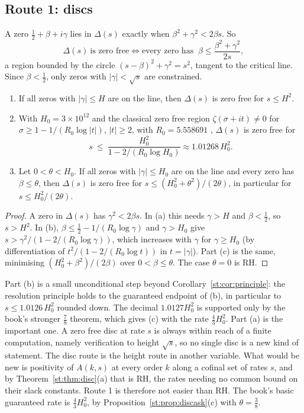 \subsection{Route 1: discs}
A zero $\tfrac12+\beta+i\gamma$ lies in $\Delta(s)$ exactly when $\beta^2+\gamma^2<2\beta s$. So
\[
\Delta(s)\ \text{is zero free}\iff\text{every zero has }\ \beta\le\frac{\beta^2+\gamma^2}{2s},
\]
a region bounded by the circle $(s-\beta)^2+\gamma^2=s^2$, tangent to the critical line. Since $\beta<\tfrac12$, only zeros with $|\gamma|<\sqrt s$ are constrained.
\begin{proposition}\label{st:prop:discask}
\begin{enumerate}
\item[(a)] If all zeros with $|\gamma|\le H$ are on the line, then $\Delta(s)$ is zero free for $s\le H^2$.
\item[(b)] With $H_0=3\times10^{12}$ and the classical zero free region $\zeta(\sigma+it)\ne0$ for $\sigma\ge1-1/(R_0\log|t|)$, $|t|\ge2$, with $R_0=5.558691$ \cite{MTY}, $\Delta(s)$ is zero free for
\[
s\ \le\ \frac{H_0^2}{1-2/(R_0\log H_0)}\approx1.01268\,H_0^2 .
\]
\item[(c)] Let $0<\theta<H_0$. If all zeros with $|\gamma|\le H_0$ are on the line and every zero has $\beta\le\theta$, then $\Delta(s)$ is zero free for $s\le(H_0^2+\theta^2)/(2\theta)$, in particular for $s\le H_0^2/(2\theta)$.
\end{enumerate}
\end{proposition}
\begin{proof}
A zero in $\Delta(s)$ has $\gamma^2<2\beta s$. In (a) this needs $\gamma>H$ and $\beta<\tfrac12$, so $s>H^2$. In (b), $\beta\le\tfrac12-1/(R_0\log\gamma)$ and $\gamma>H_0$ give $s>\gamma^2/(1-2/(R_0\log\gamma))$, which increases with $\gamma$ for $\gamma\ge H_0$ (by differentiation of $t^2/(1-2/(R_0\log t))$ in $t=|\gamma|$). Part (c) is the same, minimising $(H_0^2+\beta^2)/(2\beta)$ over $0<\beta\le\theta$. The case $\theta=0$ is RH.
\end{proof}
Part (b) is a small unconditional step beyond Corollary~\ref{st:cor:principle}: the resolution principle holds to the guaranteed endpoint of (b), in particular to $s\le1.0126\,H_0^2$ rounded down. The decimal $1.0127H_0^2$ is supported only by the book's stronger $\tfrac78$ theorem, which gives (c) with the rate $\tfrac43H_0^2$. Part (a) is the important one. A zero free disc at rate $s$ is always within reach of a finite computation, namely verification to height $\sqrt s$, so no single disc is a new kind of statement. The disc route is the height route in another variable. What would be new is positivity of $A(k,s)$ at every order $k$ along a cofinal set of rates $s$, and by Theorem~\ref{st:thm:disc}(a) that is RH, the rates needing no common bound on their slack constants. Route 1 is therefore not easier than RH. The book's basic guaranteed rate is $\tfrac43H_0^2$, by Proposition~\ref{st:prop:discask}(c) with $\theta=\tfrac38$.

